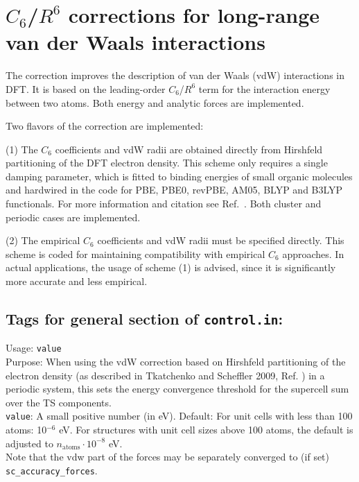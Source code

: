 \section{$C_6$/$R^6$ corrections for long-range van der Waals interactions}
The correction improves the description of van der Waals (vdW) interactions in DFT.
It is based on the leading-order $C_6$/$R^6$ term for the interaction energy
between two atoms. Both energy and analytic forces are implemented.

Two flavors of the correction are implemented:       

(1) The $C_6$ coefficients and vdW radii are obtained directly
from Hirshfeld partitioning of the DFT electron density. This scheme
only requires a single damping parameter, which is fitted to binding
energies of small organic molecules and hardwired in the code for 
PBE, PBE0, revPBE, AM05, BLYP and B3LYP functionals. For more information
and citation see Ref.~\cite{TS-vdw}. Both cluster and periodic cases are implemented.

(2) The empirical $C_6$ coefficients and vdW radii must be 
specified directly. This scheme is coded for maintaining
compatibility with empirical $C_6$ approaches. In actual
applications, the usage of scheme (1) is advised, since
it is significantly more accurate and less empirical.   

\newpage

\subsection*{Tags for general section of \texttt{control.in}:}

{
  \noindent
  Usage:  \texttt{value}\\[1.0ex]  
  Purpose: When using the vdW correction based on Hirshfeld partitioning
  of the electron density (as described in Tkatchenko and Scheffler
  2009, Ref. \cite{TS-vdw}) in a periodic system, this sets the 
  energy convergence threshold for the supercell sum over the 
  TS components. \\ 
  \texttt{value}: A small positive number (in eV). Default: 
    For unit cells with less than 100 atoms: 10$^{-6}$ eV. For structures
    with unit cell sizes above 100 atoms, the default is adjusted to
    $n_\text{atoms}\cdot10^{-8}$ eV. \\[1.0ex] 
}
Note that the vdw part of the forces may be separately converged 
to (if set) \texttt{sc\_accuracy\_forces}. 

